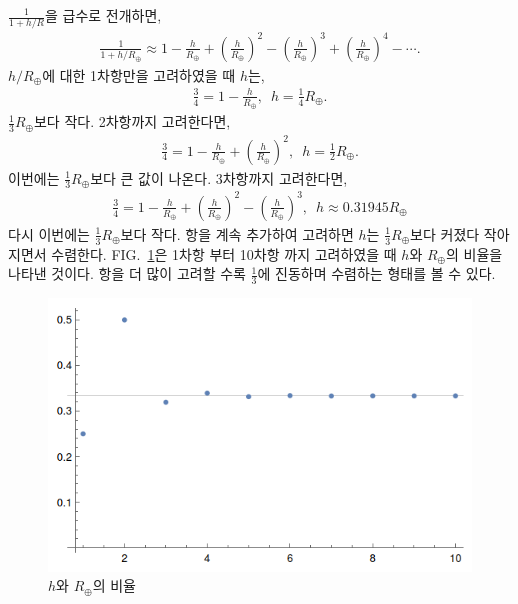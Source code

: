 \documentclass[floatfix,nofootinbib,superscriptaddress,fleqn]{revtex4-2}
\begin{document}
$\frac{1}{1+h/R}$을 급수로 전개하면,
\begin{align}
    \frac{1}{1+h/R_\oplus} \approx
    1-\frac{h}{R_\oplus}+\left(\frac{h}{R_\oplus}\right)^2
    -\left(\frac{h}{R_\oplus}\right)^3
    +\left(\frac{h}{R_\oplus}\right)^4-\cdots.
\end{align}
$h/R_\oplus$에 대한 1차항만을 고려하였을 때 $h$는,
\begin{align}
    \frac{3}{4}=1-\frac{h}{R_\oplus},\,\,\,
    h = \frac{1}{4}R_\oplus.
\end{align}
$\frac{1}{3}R_\oplus$보다 작다.
2차항까지 고려한다면,
\begin{align}
    \frac{3}{4}=1-\frac{h}{R_\oplus}
    +\left(\frac{h}{R_\oplus}\right)^2,\,\,\,
    h = \frac{1}{2}R_\oplus.
\end{align}
이번에는 $\frac{1}{3}R_\oplus$보다 큰 값이 나온다.
3차항까지 고려한다면,
\begin{align}
    \frac{3}{4}=1-\frac{h}{R_\oplus}
    +\left(\frac{h}{R_\oplus}\right)^2
    -\left(\frac{h}{R_\oplus}\right)^3 ,\,\,\,
    h \approx 0.31945 R_\oplus
\end{align}
다시 이번에는 $\frac{1}{3}R_\oplus$보다 작다. 항을 계속 추가하여 고려하면
$h$는 $\frac{1}{3}R_\oplus$보다 커졌다 작아지면서 수렴한다. FIG.~\ref{fig:1}은 
1차항 부터 10차항 까지 고려하였을 때 $h$와 $R_\oplus$의 비율을 나타낸 것이다.
항을 더 많이 고려할 수록 $\frac{1}{3}$에 진동하며 수렴하는 형태를 볼 수 있다.
\begin{figure}[htp]
    \centering
  \includegraphics[scale=0.5]{pic_1-1.png}
    \caption{$h$와 $R_\oplus$의 비율}
    \label{fig:1}
  \end{figure}
\vspace{1.cm}
\end{document}
